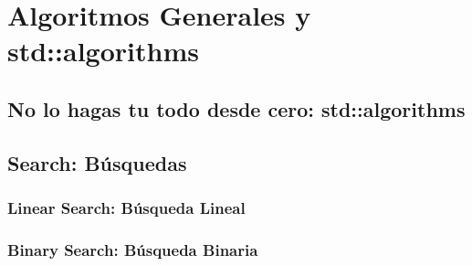 \documentclass[12pt, fleqn]{report}                             %
\theoremstyle{break}                                            %
\begin{document}
\part{Algoritmos Generales y std::algorithms}

    \clearpage
    \chapter{No lo hagas tu todo desde cero: std::algorithms}


    \clearpage
    \chapter{Search: Búsquedas}

        \section{Linear Search: Búsqueda Lineal}

        \section{Binary Search: Búsqueda Binaria}

\end{document}
